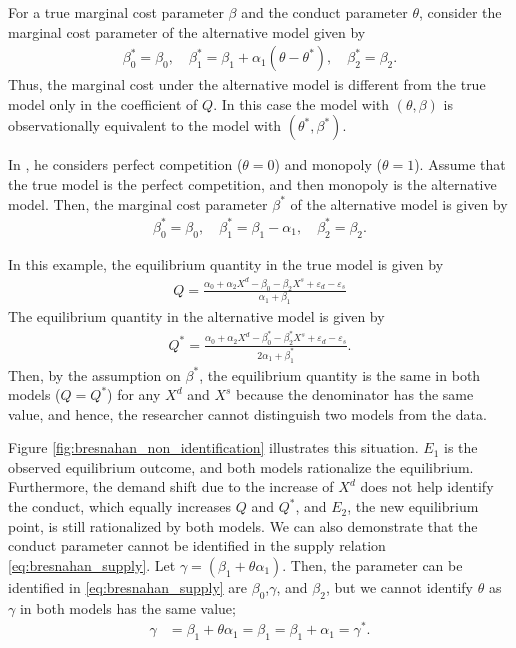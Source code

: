 \documentclass[11pt, a4paper]{article}
\theoremstyle{remark}
\begin{document}
For a true marginal cost parameter $\beta$ and the conduct parameter $\theta$, consider the marginal cost parameter of the alternative model given by
\begin{align}
    \beta_0^{*} = \beta_0, \quad \beta_1^{*} = \beta_1 + \alpha_1(\theta - \theta^{*}), \quad \beta_2^{*} = \beta_2.
\end{align}
Thus, the marginal cost under the alternative model is different from the true model only in the coefficient of $Q$.
In this case the model with $(\theta, \beta)$ is observationally equivalent to the model with $(\theta^{*}, \beta^{*})$.


In \citet{bresnahan1982oligopoly}, he considers perfect competition ($\theta = 0$) and monopoly ($\theta = 1$).
Assume that the true model is the perfect competition, and then monopoly is the alternative model.
Then, the marginal cost parameter $\beta^{*}$ of the alternative model is given by
\begin{align}
    \beta_0^{*} = \beta_0, \quad \beta_1^{*} = \beta_1 - \alpha_1, \quad \beta_2^{*} = \beta_2.
\end{align}

In this example, the equilibrium quantity in the true model is given by
\begin{align}
    Q = \frac{\alpha_0 + \alpha_2 X^d - \beta_0 - \beta_2 X^s + \varepsilon_d - \varepsilon_s}{\alpha_1 + \beta_1}
\end{align}
The equilibrium quantity in the alternative model is given by
\begin{align}
    Q^{*} = \frac{\alpha_0 + \alpha_2 X^d - \beta_0^{*} - \beta_2^{*} X^s + \varepsilon_d - \varepsilon_s}{2\alpha_1 + \beta_1^{*}}.
\end{align}
Then, by the assumption on $\beta^{*}$, the equilibrium quantity is the same in both models ($Q = Q^{*}$) for any $X^d$ and $X^s$ because the denominator has the same value, and hence, the researcher cannot distinguish two models from the data.

Figure \ref{fig:bresnahan_non_identification} illustrates this situation.
$E_1$ is the observed equilibrium outcome, and both models rationalize the equilibrium.
Furthermore, the demand shift due to the increase of $X^d$ does not help identify the conduct, which equally increases $Q$ and $Q^{*}$, and $E_2$, the new equilibrium point, is still rationalized by both models.
We can also demonstrate that the conduct parameter cannot be identified in the supply relation \eqref{eq:bresnahan_supply}.
Let $\gamma = (\beta_1 + \theta \alpha_1)$.
Then, the parameter can be identified  in \eqref{eq:bresnahan_supply} are $\beta_0$,$\gamma$, and $\beta_2$, but we cannot identify $\theta$ as $\gamma$ in both models has the same value; 
\begin{align}
    \gamma &= \beta_1 + \theta \alpha_1 = \beta_1 = \beta_1 + \alpha_1 = \gamma^{*}.
\end{align}
\end{document}
